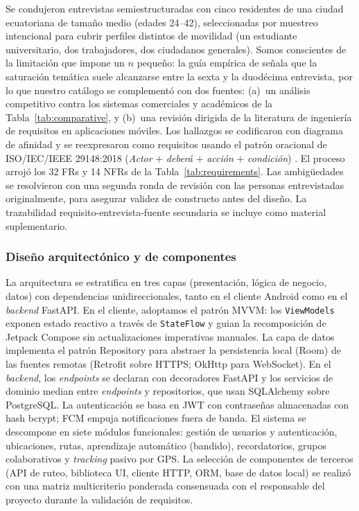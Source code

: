 \documentclass[a4paper,fleqn]{cas-sc}
\newcommand{\MVVM}{MVVM\xspace}
\begin{document}
	Se condujeron entrevistas semiestructuradas con cinco residentes de una ciudad ecuatoriana de tama\~no medio (edades 24--42), seleccionadas por muestreo intencional para cubrir perfiles distintos de movilidad (un estudiante universitario, dos trabajadores, dos ciudadanos generales). Somos conscientes de la limitaci\'on que impone un $n$ peque\~no: la gu\'ia emp\'irica de \citet{guest2006saturation} se\~nala que la saturaci\'on tem\'atica suele alcanzarse entre la sexta y la duod\'ecima entrevista, por lo que nuestro cat\'alogo se complement\'o con dos fuentes: (a)~un an\'alisis competitivo contra los sistemas comerciales y acad\'emicos de la Tabla~\ref{tab:comparative}, y (b)~una revisi\'on dirigida de la literatura de ingenier\'ia de requisitos en aplicaciones m\'oviles. Los hallazgos se codificaron con diagrama de afinidad y se reexpresaron como requisitos usando el patr\'on oracional de ISO/IEC/IEEE 29148:2018 (\emph{Actor} $+$ \emph{deber\'a} $+$ \emph{acci\'on} $+$ \emph{condici\'on}) \citep{iso29148}. El proceso arroj\'o los 32 FRs y 14 NFRs de la Tabla~\ref{tab:requirements}. Las ambig\"uedades se resolvieron con una segunda ronda de revisi\'on con las personas entrevistadas originalmente, para asegurar validez de constructo antes del dise\~no. La trazabilidad requisito-entrevista-fuente secundaria se incluye como material suplementario.
	
	\subsubsection{Dise\~no arquitect\'onico y de componentes}\label{sec:arch}
	
	La arquitectura se estratifica en tres capas (presentaci\'on, l\'ogica de negocio, datos) con dependencias unidireccionales, tanto en el cliente Android como en el \emph{backend} FastAPI. En el cliente, adoptamos el patr\'on \MVVM: los \texttt{ViewModels} exponen estado reactivo a trav\'es de \texttt{StateFlow} y guian la recomposici\'on de Jetpack Compose sin actualizaciones imperativas manuales. La capa de datos implementa el patr\'on Repository para abstraer la persistencia local (Room) de las fuentes remotas (Retrofit sobre HTTPS; OkHttp para WebSocket). En el \emph{backend}, los \emph{endpoints} se declaran con decoradores FastAPI y los servicios de dominio median entre \emph{endpoints} y repositorios, que usan SQLAlchemy sobre PostgreSQL. La autenticaci\'on se basa en JWT con contrase\~nas almacenadas con hash bcrypt; FCM empuja notificaciones fuera de banda. El sistema se descompone en siete m\'odulos funcionales: gesti\'on de usuarios y autenticaci\'on, ubicaciones, rutas, aprendizaje autom\'atico (bandido), recordatorios, grupos colaborativos y \emph{tracking} pasivo por GPS. La selecci\'on de componentes de terceros (API de ruteo, biblioteca UI, cliente HTTP, ORM, base de datos local) se realiz\'o con una matriz multicriterio ponderada consensuada con el responsable del proyecto durante la validaci\'on de requisitos.
	
\end{document}
